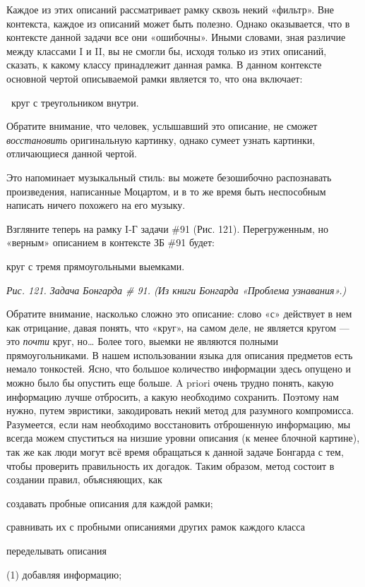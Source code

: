 \documentclass[../main.tex]{subfiles}
\begin{document}
Каждое из этих описаний рассматривает рамку сквозь некий «фильтр». Вне контекста, каждое из описаний может быть полезно. Однако оказывается, что в контексте данной задачи все они «ошибочны». Иными словами, зная различие между классами I и II, вы не смогли бы, исходя только из этих описаний, сказать, к какому классу принадлежит данная рамка. В данном контексте основной чертой описываемой рамки является то, что она включает:

~круг с треугольником внутри.

Обратите внимание, что человек, услышавший это описание, не сможет \emph{восстановить} оригинальную картинку, однако сумеет узнать картинки, отличающиеся данной чертой.

Это напоминает музыкальный стиль: вы можете безошибочно распознавать произведения, написанные Моцартом, и в то же время быть неспособным написать ничего похожего на его музыку.

Взгляните теперь на рамку I-Г задачи \#91 (Рис. 121). Перегруженным, но «верным» описанием в контексте ЗБ \#91 будет:

круг с тремя прямоугольными выемками.

\emph{Рис. 121. Задача Бонгарда \# 91. (Из книги Бонгарда «Проблема узнавания».)}

Обратите внимание, насколько сложно это описание: слово «с» действует в нем как отрицание, давая понять, что «круг», на самом деле, не является кругом --- это \emph{почти} круг, но\ldots{} Более того, выемки не являются полными прямоугольниками. В нашем использовании языка для описания предметов есть немало тонкостей. Ясно, что большое количество информации здесь опущено и можно было бы опустить еще больше. A priori очень трудно понять, какую информацию лучше отбросить, а какую необходимо сохранить. Поэтому нам нужно, путем эвристики, закодировать некий метод для разумного компромисса. Разумеется, если нам необходимо восстановить отброшенную информацию, мы всегда можем спуститься на низшие уровни описания (к менее блочной картине), так же как люди могут всё время обращаться к данной задаче Бонгарда с тем, чтобы проверить правильность их догадок. Таким образом, метод состоит в создании правил, объясняющих, как

создавать пробные описания для каждой рамки;

сравнивать их с пробными описаниями других рамок каждого класса

переделывать описания

(1) добавляя информацию;
\end{document}
